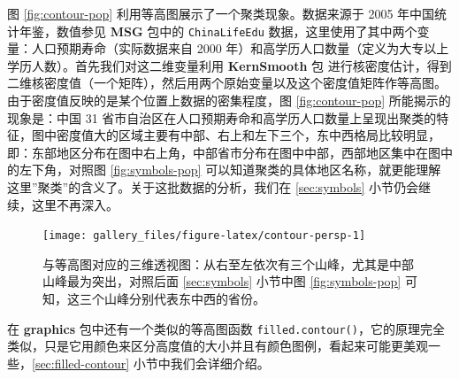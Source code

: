 \documentclass[
  b5paper,
  UTF8,twoside]{book}
\newenvironment{Shaded}{\begin{snugshade}}{\end{snugshade}}
\newcommand{\AttributeTok}[1]{\textcolor[rgb]{0.77,0.63,0.00}{#1}}
\newcommand{\CommentTok}[1]{\textcolor[rgb]{0.56,0.35,0.01}{\textit{#1}}}
\newcommand{\ConstantTok}[1]{\textcolor[rgb]{0.00,0.00,0.00}{#1}}
\newcommand{\DecValTok}[1]{\textcolor[rgb]{0.00,0.00,0.81}{#1}}
\newcommand{\FloatTok}[1]{\textcolor[rgb]{0.00,0.00,0.81}{#1}}
\newcommand{\FunctionTok}[1]{\textcolor[rgb]{0.00,0.00,0.00}{#1}}
\newcommand{\NormalTok}[1]{#1}
\newcommand{\SpecialCharTok}[1]{\textcolor[rgb]{0.00,0.00,0.00}{#1}}
\newcommand{\StringTok}[1]{\textcolor[rgb]{0.31,0.60,0.02}{#1}}
\begin{document}
图 \ref{fig:contour-pop}
利用等高图展示了一个聚类现象。数据来源于 2005 年中国统计年鉴，数值参见 \textbf{MSG} 包中的 \texttt{ChinaLifeEdu} 数据，这里使用了其中两个变量：人口预期寿命（实际数据来自 2000 年）和高学历人口数量（定义为大专以上学历人数）。首先我们对这二维变量利用 \textbf{KernSmooth} 包 \citep{KernSmooth} 进行核密度估计，得到二维核密度值（一个矩阵），然后用两个原始变量以及这个密度值矩阵作等高图。由于密度值反映的是某个位置上数据的密集程度，图 \ref{fig:contour-pop} 所能揭示的现象是：中国 31 省市自治区在人口预期寿命和高学历人口数量上呈现出聚类的特征，图中密度值大的区域主要有中部、右上和左下三个，东中西格局比较明显，即：东部地区分布在图中右上角，中部省市分布在图中中部，西部地区集中在图中的左下角，对照图 \ref{fig:symbols-pop} 可以知道聚类的具体地区名称，就更能理解这里''聚类''的含义了。关于这批数据的分析，我们在 \ref{sec:symbols} 小节仍会继续，这里不再深入。





\begin{Shaded}
\end{Shaded}

\begin{figure}

{\centering \texttt{[image: gallery\_files/figure-latex/contour-persp-1]} 

}

\caption[与等高图对应的三维透视图]{与等高图对应的三维透视图：从右至左依次有三个山峰，尤其是中部山峰最为突出，对照后面 \ref{sec:symbols} 小节中图 \ref{fig:symbols-pop} 可知，这三个山峰分别代表东中西的省份。}\label{fig:contour-persp}
\end{figure}

在 \textbf{graphics} 包中还有一个类似的等高图函数 \texttt{filled.contour()}，它的原理完全类似，只是它用颜色来区分高度值的大小并且有颜色图例，看起来可能更美观一些，\ref{sec:filled-contour} 小节中我们会详细介绍。
\end{document}
